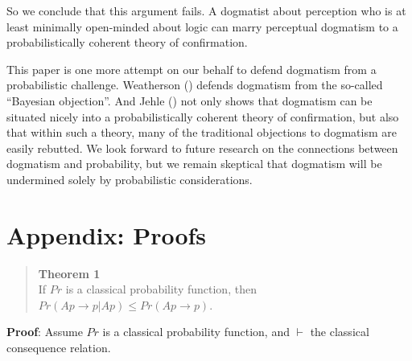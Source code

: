 \documentclass[
  11pt,
  letterpaper,
  DIV=11,
  numbers=noendperiod,
  oneside]{scrartcl}
\begin{document}
So we conclude that this argument fails. A dogmatist about perception
who is at least minimally open-minded about logic can marry perceptual
dogmatism to a probabilistically coherent theory of confirmation.

This paper is one more attempt on our behalf to defend dogmatism from a
probabilistic challenge. Weatherson
() defends dogmatism from the
so-called ``Bayesian objection''. And Jehle
() not only shows that dogmatism can be
situated nicely into a probabilistically coherent theory of
confirmation, but also that within such a theory, many of the
traditional objections to dogmatism are easily rebutted. We look forward
to future research on the connections between dogmatism and probability,
but we remain skeptical that dogmatism will be undermined solely by
probabilistic considerations.

\section*{Appendix: Proofs}\label{appendix-proofs}

\begin{quote}
\textbf{Theorem 1}\\
If \(Pr\) is a classical probability function, then\\
\(Pr(Ap \rightarrow p | Ap) \leq Pr(Ap \rightarrow p)\).
\end{quote}

\textbf{Proof}: Assume \(Pr\) is a classical probability function, and
\(\vdash\) the classical consequence relation.
\end{document}
